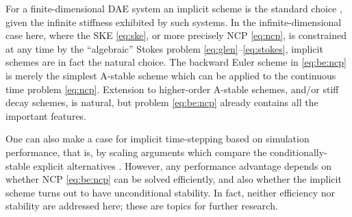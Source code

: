 \documentclass[hidelinks,onefignum,onetabnum,final]{siamart220329}  %
\begin{document}
For a finite-dimensional DAE system an implicit scheme is the standard choice \cite{AscherPetzold1998}, given the infinite stiffness exhibited by such systems.  In the infinite-dimensional case here, where the SKE \eqref{eq:ske}, or more precisely NCP \eqref{eq:ncp}, is constrained at any time by the ``algebraic'' Stokes problem \eqref{eq:glen}--\eqref{eq:stokes}, implicit schemes are in fact the natural choice.  The backward Euler scheme in \eqref{eq:be:ncp} is merely the simplest A-stable scheme which can be applied to the continuous time problem \eqref{eq:ncp}.  Extension to higher-order A-stable schemes, and/or stiff decay \cite{AscherPetzold1998} schemes, is natural, but problem \eqref{eq:be:ncp} already contains all the important features.

One can also make a case for implicit time-stepping based on simulation performance, that is, by scaling arguments which compare the conditionally-stable explicit alternatives \cite{Bueler2023}.  However, any performance advantage depends on whether NCP \eqref{eq:be:ncp} can be solved efficiently, and also whether the implicit scheme turns out to have unconditional stability.  In fact, neither efficiency nor stability are addressed here; these are topics for further research.
\end{document}
